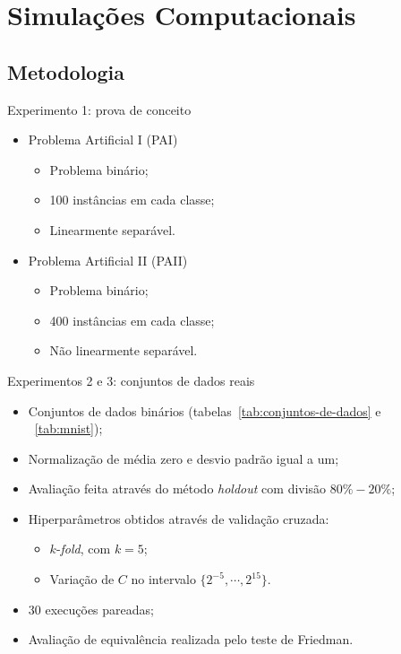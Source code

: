 \documentclass{beamer}
\begin{document}
\section{Simulações Computacionais}

\subsection{Metodologia}
\begin{frame}{Experimento 1: prova de conceito}
  \begin{itemize}
    \item Problema Artificial I (PAI)
      \begin{itemize}
        \item Problema binário;
        \item 100 instâncias em cada classe;
        \item Linearmente separável.
      \end{itemize}
    \item Problema Artificial II (PAII)
      \begin{itemize}
        \item Problema binário;
        \item 400 instâncias em cada classe;
        \item Não linearmente separável.
      \end{itemize}
  \end{itemize}
\end{frame}


\begin{frame}{Experimentos 2 e 3: conjuntos de dados reais}
  \begin{itemize}
    \item Conjuntos de dados binários (tabelas~\ref{tab:conjuntos-de-dados} e ~\ref{tab:mnist});
    \item Normalização de média zero e desvio padrão igual a um;
    \item Avaliação feita através do método \textit{holdout} com divisão $80\%-20\%$;
    \item Hiperparâmetros obtidos através de validação cruzada:
      \begin{itemize}
        \item $k$-\textit{fold}, com $k = 5$;
        \item Variação de $C$ no intervalo $\{2^{-5}, \cdots, 2^{15}\}$.
      \end{itemize}
    \item 30 execuções pareadas;
    \item Avaliação de equivalência realizada pelo teste de Friedman.
  \end{itemize}
\end{frame}
\end{document}
